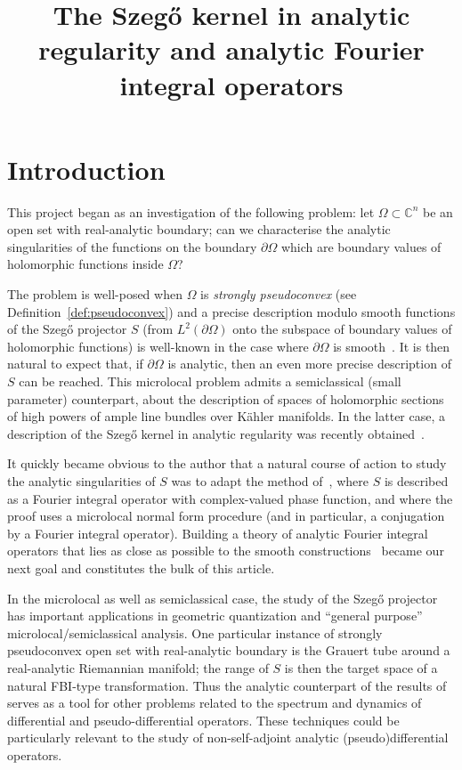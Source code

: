 \documentclass[AHL,Unicode,longabstracts,published]{cedram}
\title[Analytic Szeg\H{o} kernel and Fourier integral operators]{The Szeg\H{o} kernel in analytic regularity and analytic Fourier integral operators}
\author[\initial{A.} \lastname{Deleporte}]{\firstname{Alix} \lastname{Deleporte}}
\newcommand\1{\mathds{1}}
\newcommand{\C}{\mathbb{C}}
\begin{document}
\maketitle

\section{Introduction}
\label{sec:introduction}
This project began as an investigation of the following problem: let $\Omega\subset \C^n$ be an open set with real-analytic boundary; can we characterise the analytic singularities of the functions on the boundary $\partial \Omega$ which are boundary values of holomorphic functions inside $\Omega$?

The problem is well-posed when $\Omega$ is \emph{strongly pseudoconvex} (see Definition~\ref{def:pseudoconvex}) and a precise description modulo smooth functions of the Szeg\H{o} projector $S$ (from $L^2(\partial \Omega)$ onto the subspace of boundary values of holomorphic functions) is well-known in the case where $\partial \Omega$ is smooth~\cite{boutet_de_monvel_sur_1975,fefferman_bergman_1976}. It is then natural to expect that, if $\partial \Omega$ is analytic, then an even more precise description of $S$ can be reached. This microlocal problem admits a semiclassical (small parameter) counterpart, about the description of spaces of holomorphic sections of high powers of ample line bundles over K\"ahler manifolds. In the latter case, a description of the Szeg\H{o} kernel in analytic regularity was recently obtained~\cite{charles_analytic_2021,deleporte_toeplitz_2018,deleporte_direct_2024,hezari_off-diagonal_2017,hezari_property_2021,rouby_analytic_2018}.

It quickly became obvious to the author that a natural course of action to study the analytic singularities of $S$ was to adapt the method of~\cite{boutet_de_monvel_sur_1975}, where $S$ is described as a {Fourier integral operator} with complex-valued phase function, and where the proof uses a microlocal normal form procedure (and in particular, a conjugation by a {Fourier integral operator}). Building a theory of analytic {Fourier integral operators} that lies as close as possible to the smooth constructions~\cite{hormander_analysis_1985} became our next goal and constitutes the bulk of this article.

In the microlocal as well as semiclassical case, the study of the Szeg\H{o} projector has important applications in geometric quantization and ``general purpose'' microlocal/semiclassical analysis. One particular instance of strongly pseudoconvex open set with real-analytic boundary is the Grauert tube around a real-analytic Riemannian manifold; the range of $S$ is then the target space of a natural FBI-type transformation. Thus the analytic counterpart of the results of~\cite{boutet_de_monvel_sur_1975} serves as a tool for other problems related to the spectrum and dynamics of differential and pseudo-differential operators. These techniques could be particularly relevant to the study of non-self-adjoint analytic (pseudo)differential operators.
\end{document}
